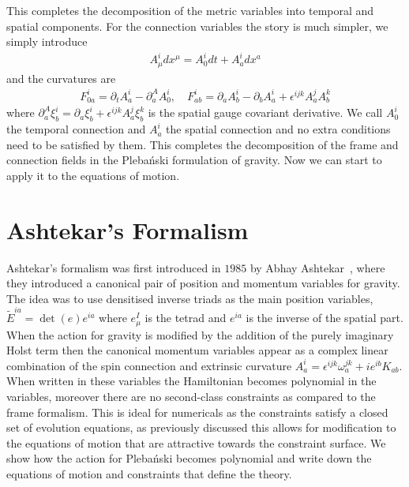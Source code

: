 \documentclass[10pt]{report}
\newcommand{\pleb}[0]{Pleba\'nski}
\theoremstyle{definition}
\newcommand{\tE}[0]{\tilde{E}}
\begin{document}
    This completes the decomposition of the metric variables into temporal and spatial components. For the connection variables the story is much simpler, we simply introduce
    \begin{align}
        A^i_\mu dx^\mu = A^i_0 dt + A^i_a dx^a
    \end{align}
    and the curvatures are 
    \begin{align}
        F^i_{0a} = \partial_t A^i_a - \partial^A_a A^i_0, \quad F^i_{ab} = \partial_a A^i_b - \partial_b A^i_a + \epsilon^{ijk} A^j_a A^k_b
    \end{align}
    where $\partial^A_a \xi^i_b = \partial_a \xi^i_b + \epsilon^{ijk} A^j_a \xi^k_b$ is the spatial gauge covariant derivative. We call $A^i_0$ the temporal connection and $A^i_a$ the spatial connection and no extra conditions need to be satisfied by them. This completes the decomposition of the frame and connection fields in the \pleb{} formulation of gravity. Now we can start to apply it to the equations of motion.

    \section{Ashtekar's Formalism} \label{sec:pleb-num-ashtekar-formalism}
    Ashtekar's formalism was first introduced in $1985$ by Abhay Ashtekar~\cite{NewVariablesFAshtek1986}, where they introduced a canonical pair of position and momentum variables for gravity. The idea was to use densitised inverse triads as the main position variables, $\tE^{ia} =  \det(e) e^{ia}$ where $e^I_\mu$ is the tetrad and $e^{ia}$ is the inverse of the spatial part. When the action for gravity is modified by the addition of the purely imaginary Holst term then the canonical momentum variables appear as a complex linear combination of the spin connection and extrinsic curvature $A^i_a = \epsilon^{ijk} \omega^{jk}_a + i e^{ib} K_{ab}$. When written in these variables the Hamiltonian becomes polynomial in the variables, moreover there are no second-class constraints as compared to the frame formalism. This is ideal for numericals as the constraints satisfy a closed set of evolution equations, as previously discussed this allows for modification to the equations of motion that are attractive towards the constraint surface. We show how the action for \pleb{} becomes polynomial and write down the equations of motion and constraints that define the theory.
\end{document}
